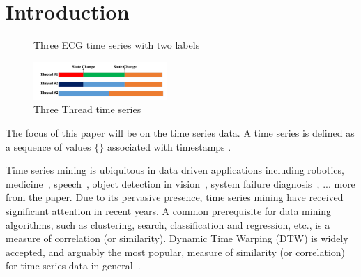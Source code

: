 \section{Introduction}
\label{sec:introduction}

\begin{figure}[t]
\centering
{}\hspace{0.001em}
\hspace{0.001em}
\hspace{0.001em}
\caption{ Three ECG time series with two labels }
\label{fig:ecgexample}
\end{figure}

\begin{figure}[t]
\centering
\includegraphics[width=0.45\textwidth]{HPCExample.pdf}
\caption{Three Thread time series}
\label{fig:hpcexample}
\end{figure}

The focus of this paper will be on the time series data. A time series is defined as a sequence of values $\{\}$ associated with timestamps $ $.

Time series mining is ubiquitous in data driven applications including robotics, medicine~\cite{}, speech~\cite{rabiner1993fundamentals}, object detection in vision~\cite{yang2002detecting, sonka2014image}, system failure diagnosis~\cite{luo2014correlating,sun2014querying}, ... more from the paper.  Due to its pervasive presence, time series mining have received significant attention in recent years. A common prerequisite for data mining algorithms, such as clustering, search, classification and regression, etc., is a measure of correlation (or similarity). Dynamic Time Warping (DTW) is widely accepted, and arguably the most popular, measure of similarity (or correlation) for time series data in general~\cite{}.

